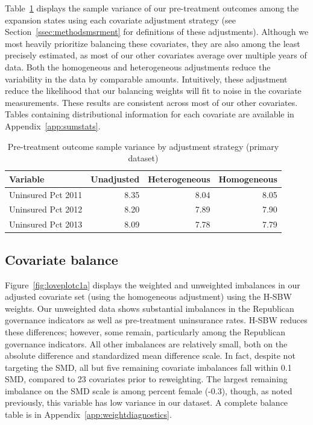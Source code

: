 \documentclass[aoas]{imsart}
\theoremstyle{plain}
\theoremstyle{remark}
\begin{document}
Table~\ref{tab:adjust1} displays the sample variance of our pre-treatment outcomes among the expansion states using each covariate adjustment strategy (see Section~\ref{ssec:methodsmsrment} for definitions of these adjustments). Although we most heavily prioritize balancing these covariates, they are also among the least precisely estimated, as most of our other covariates average over multiple years of data. Both the homogeneous and heterogeneous adjustments reduce the variability in the data by comparable amounts. Intuitively, these adjustment reduce the likelihood that our balancing weights will fit to noise in the covariate measurements. These results are consistent across most of our other covariates. Tables containing distributional information for each covariate are available in Appendix~\ref{app:sumstats}. 

\begin{table}[ht]
\caption{Pre-treatment outcome sample variance by adjustment strategy (primary dataset)}\label{tab:adjust1}
\begin{tabular}{lrrr}
  \hline
Variable & Unadjusted & Heterogeneous & Homogeneous \\ 
  \hline
Uninsured Pct 2011 & 8.35 & 8.04 & 8.05 \\ 
  Uninsured Pct 2012 & 8.20 & 7.89 & 7.90 \\ 
  Uninsured Pct 2013 & 8.09 & 7.78 & 7.79 \\ 
   \hline
\end{tabular}
\end{table}

\subsection{Covariate balance}

Figure~\ref{fig:loveplotc1a} displays the weighted and unweighted imbalances in our adjusted covariate set (using the homogeneous adjustment) using the H-SBW weights. Our unweighted data shows substantial imbalances in the Republican governance indicators as well as pre-treatment uninsurance rates. H-SBW reduces these differences; however, some remain, particularly among the Republican governance indicators. All other imbalances are relatively small, both on the absolute difference and standardized mean difference scale. In fact, despite not targeting the SMD, all but five remaining covariate imbalances fall within 0.1 SMD, compared to 23 covariates prior to reweighting. The largest remaining imbalance on the SMD scale is among percent female (-0.3), though, as noted previously, this variable has low variance in our dataset. A complete balance table is in Appendix~\ref{app:weightdiagnostics}. 
\end{document}
